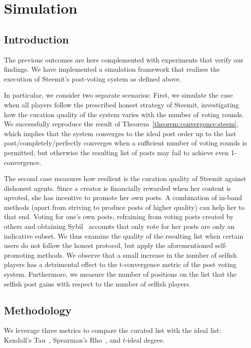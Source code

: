 \section{Simulation}
  \subsection{Introduction}
    The previous outcomes are here complemented with experiments that verify our
    findings. We have implemented a simulation framework that realizes the
    execution of Steemit's post-voting system as defined above.

    In particular, we consider two separate scenarios: First, we simulate the
    case when all players follow the prescribed honest strategy of Steemit,
    investigating how the curation quality of the system varies with the number
    of voting rounds. We successfully reproduce the result of
    Theorem~\ref{theorem:convergence:steem}, which implies that the system
    converges to the ideal post order up to the last post/completely/perfectly
    converges when a sufficient number of voting rounds is permitted, but
    otherwise the resulting list of posts may fail to achieve even
    1-convergence.

    The second case measures how resilient is the curation quality of Steemit
    against dishonest agents. Since a creator is financially rewarded when her
    content is upvoted, she has incentive to promote her own posts. A
    combination of in-band methods (apart from striving to produce posts of
    higher quality) can help her to that end. Voting for one's own posts,
    refraining from voting posts created by others and obtaining
    Sybil~\cite{sybilattack} accounts that only vote for her posts are only an
    indicative subset. We thus examine the quality of the resulting list when
    certain users do not follow the honest protocol, but apply the
    aforementioned self-promoting methods. We observe that a small increase in
    the number of selfish players has a detrimental effect to the t-convergence
    metric of the post voting system. Furthermore, we measure the number of
    positions on the list that the selfish post gains with respect to the number
    of selfish players.

  \subsection{Methodology}
    We leverage three metrics to compare the curated list with the ideal list:
    Kendall's Tau~\cite{kendall1955rank}, Spearman's
    Rho~\cite{spearman1904proof}, and $t$-ideal degree.

